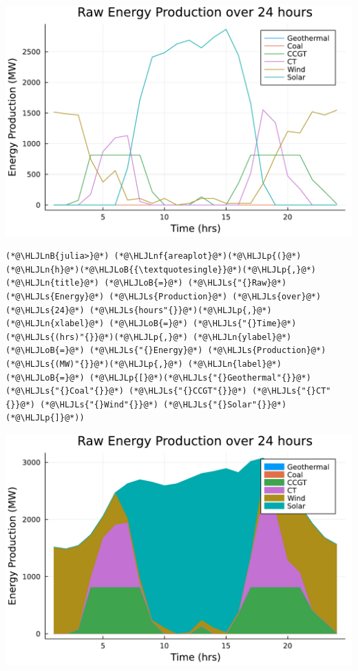 \documentclass[12pt,a4paper]{article}
\newcommand{\HLJLn}[1]{#1}
\newcommand{\HLJLnf}[1]{\textcolor[RGB]{66,102,213}{#1}}
\newcommand{\HLJLs}[1]{\textcolor[RGB]{201,61,57}{#1}}
\newcommand{\HLJLnB}[1]{\textcolor[RGB]{59,151,46}{#1}}
\newcommand{\HLJLoB}[1]{\textcolor[RGB]{102,102,102}{\textbf{#1}}}
\newcommand{\HLJLp}[1]{#1}
\begin{document}
\includegraphics[width=\linewidth]{figures/solution-template_8_1.pdf}

\begin{lstlisting}
(*@\HLJLnB{julia>}@*) (*@\HLJLnf{areaplot}@*)(*@\HLJLp{(}@*)(*@\HLJLn{h}@*)(*@\HLJLoB{{\textquotesingle}}@*)(*@\HLJLp{,}@*)(*@\HLJLn{title}@*) (*@\HLJLoB{=}@*) (*@\HLJLs{"{}Raw}@*) (*@\HLJLs{Energy}@*) (*@\HLJLs{Production}@*) (*@\HLJLs{over}@*) (*@\HLJLs{24}@*) (*@\HLJLs{hours"{}}@*)(*@\HLJLp{,}@*) (*@\HLJLn{xlabel}@*) (*@\HLJLoB{=}@*) (*@\HLJLs{"{}Time}@*) (*@\HLJLs{(hrs)"{}}@*)(*@\HLJLp{,}@*) (*@\HLJLn{ylabel}@*) (*@\HLJLoB{=}@*) (*@\HLJLs{"{}Energy}@*) (*@\HLJLs{Production}@*) (*@\HLJLs{(MW)"{}}@*)(*@\HLJLp{,}@*) (*@\HLJLn{label}@*)(*@\HLJLoB{=}@*) (*@\HLJLp{[}@*)(*@\HLJLs{"{}Geothermal"{}}@*) (*@\HLJLs{"{}Coal"{}}@*) (*@\HLJLs{"{}CCGT"{}}@*) (*@\HLJLs{"{}CT"{}}@*) (*@\HLJLs{"{}Wind"{}}@*) (*@\HLJLs{"{}Solar"{}}@*)(*@\HLJLp{]}@*))
\end{lstlisting}
\includegraphics[width=\linewidth]{figures/solution-template_8_2.pdf}
\end{document}
